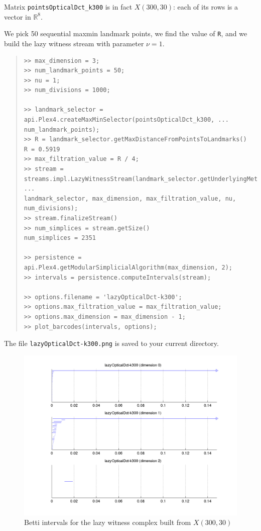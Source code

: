 \documentclass[amscd, amssymb, verbatim]{amsart}[12pt]
\theoremstyle{remark}
\theoremstyle{remark}
\theoremstyle{remark}
\newcommand{\R}{\mathbb{R}}
\begin{document}
Matrix \texttt{pointsOpticalDct\_k300} is in fact $X(300,30)$: each of its rows is a vector in $\R^8$.

We pick 50 sequential maxmin landmark points, we find the value of \texttt{R}, and we build the lazy witness stream with parameter $\nu = 1$. 

\begin{quote} \begin{verbatim}
>> max_dimension = 3;
>> num_landmark_points = 50;
>> nu = 1;
>> num_divisions = 1000;

>> landmark_selector = api.Plex4.createMaxMinSelector(pointsOpticalDct_k300, ...
num_landmark_points);
>> R = landmark_selector.getMaxDistanceFromPointsToLandmarks() 
R = 0.5919                         
>> max_filtration_value = R / 4;
>> stream = streams.impl.LazyWitnessStream(landmark_selector.getUnderlyingMetricSpace(), ...
landmark_selector, max_dimension, max_filtration_value, nu, num_divisions);
>> stream.finalizeStream()
>> num_simplices = stream.getSize()
num_simplices = 2351                         

>> persistence = api.Plex4.getModularSimplicialAlgorithm(max_dimension, 2);
>> intervals = persistence.computeIntervals(stream);

>> options.filename = 'lazyOpticalDct-k300';
>> options.max_filtration_value = max_filtration_value;
>> options.max_dimension = max_dimension - 1;
>> plot_barcodes(intervals, options);
\end{verbatim} \end{quote}

The file \texttt{lazyOpticalDct-k300.png} is saved to your current directory.

\begin{figure}[htp]
	\begin{center}
    	\includegraphics[width=6in]{lazyOpticalDct-k300.png}
   	\end{center}
	\caption{Betti intervals for the lazy witness complex built from $X(300,30)$}
  	\label{fig:rangeBetti}
\end{figure}
\FloatBarrier
\end{document}
